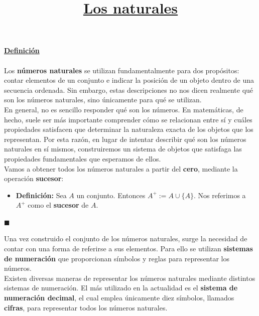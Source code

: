 \documentclass[10 pt]{article}
\title{\textbf{\underline{Los naturales}}}
\author{}
\date{}
\begin{document}
\pagestyle{empty}
\maketitle
\thispagestyle{empty}

\section*{}

\LARGE{\textbf{\underline{Definición}}}\\ \\

\Large{Los \textbf{números naturales} se utilizan fundamentalmente para dos propósitos: contar elementos de un conjunto e indicar la posición de un objeto dentro de una secuencia ordenada. Sin embargo, estas descripciones no nos dicen realmente qué son los números naturales, sino únicamente para qué se utilizan. \\

En general, no es sencillo responder qué son los números. En matemáticas, de hecho, suele ser más importante comprender cómo se relacionan entre sí y cuáles propiedades satisfacen que determinar la naturaleza exacta de los objetos que los representan. Por esta razón, en lugar de intentar describir qué son los números naturales en sí mismos, construiremos un sistema de objetos que satisfaga las propiedades fundamentales que esperamos de ellos.} \\

\Large{Vamos a obtener todos los números naturales a partir del \textbf{cero}, mediante la operación \textbf{sucesor}:} \\

\begin{itemize}
    \item \Large{\textbf{Definición:} Sea $A$ un conjunto. Entonces $A^+:=A \cup \{A\}$. Nos referimos a $A^+$ como el \textbf{sucesor} de $A$.} \\
\end{itemize}

\begin{flushright}
    $\blacksquare$
\end{flushright}

\Large{Una vez construido el conjunto de los números naturales, surge la necesidad de contar con una forma de referirse a sus elementos. Para ello se utilizan \textbf{sistemas de numeración} que proporcionan símbolos y reglas para representar los números. \\

Existen diversas maneras de representar los números naturales mediante distintos sistemas de numeración. El más utilizado en la actualidad es el \textbf{sistema de numeración decimal}, el cual emplea únicamente diez símbolos, llamados \textbf{cifras}, para representar todos los números naturales.} \\
\end{document}
